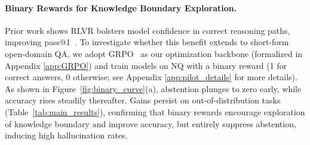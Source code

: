 \documentclass{article} %
\begin{document}





\paragraph{Binary Rewards for Knowledge Boundary Exploration.}
Prior work shows RLVR bolsters model confidence in correct reasoning paths, improving pass@1~\citep{NIPS-RL,zhang2025interplaypretrainingmidtrainingrl}. 
To investigate whether this benefit extends to short-form open-domain QA, we adopt GRPO~\citep{DeepSeekMath} as our optimization backbone (formalized in Appendix \ref{app:GRPO}) and train models on NQ with a binary reward (1 for correct answers, 0 otherwise; see Appendix \ref{app:pilot_details} for more details).
As shown in Figure~\ref{fig:binary_curve}(a), abstention plunges to zero early, while accuracy rises steadily thereafter.
Gains persist on out-of-distribution tasks (Table~\ref{tab:main_results}), confirming that binary rewards encourage exploration of knowledge boundary and improve accuracy, but entirely suppress abstention, inducing high hallucination rates.
\end{document}
